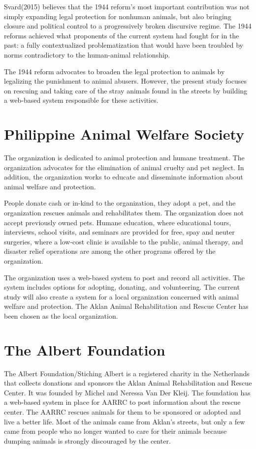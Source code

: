 Svard(2015) believes that the 1944 reform’s most important contribution was
not simply expanding legal protection for nonhuman animals, but also bringing
closure and political control to a progressively broken discursive regime. The 1944
reforms achieved what proponents of the current system had fought for in the past:
a fully contextualized problematization that would have been troubled by norms
contradictory to the human-animal relationship.

The 1944 reform advocates to broaden the legal protection to animals by
legalizing the punishment to animal abusers. However, the present study focuses
on rescuing and taking care of the stray animals found in the streets by building
a web-based system responsible for these activities.

\section{Philippine Animal Welfare Society}

The organization is dedicated to animal protection and humane treatment.
The organization advocates for the elimination of animal cruelty and pet neglect.
In addition, the organization works to educate and disseminate information about
animal welfare and protection.

People donate cash or in-kind to the organization, they adopt a pet,
and the organization rescues animals and rehabilitates them. The organization
does not accept previously owned pets. Humane education, where educational
tours, interviews, school visits, and seminars are provided for free, spay and neuter
surgeries, where a low-cost clinic is available to the public, animal therapy, and
disaster relief operations are among the other programs offered by the organization\cite{paws2013programs}.

The organization uses a web-based system to post and record all activities. The
system includes options for adopting, donating, and volunteering. The current
study will also create a system for a local organization concerned with animal
welfare and protection. The Aklan Animal Rehabilitation and Rescue Center has
been chosen as the local organization.

\section{The Albert Foundation}

The Albert Foundation/Stiching Albert is a registered charity in the Netherlands
that collects donations and sponsors the Aklan Animal Rehabilitation and
Rescue Center. It was founded by Michel and Neressa Van Der Kleij. The foundation
has a web-based system in place for AARRC to post information about the
rescue center. The AARRC rescues animals for them to be sponsored or adopted
and live a better life. Most of the animals came from Aklan’s streets, but only
a few came from people who no longer wanted to care for their animals because
dumping animals is strongly discouraged by the center.

